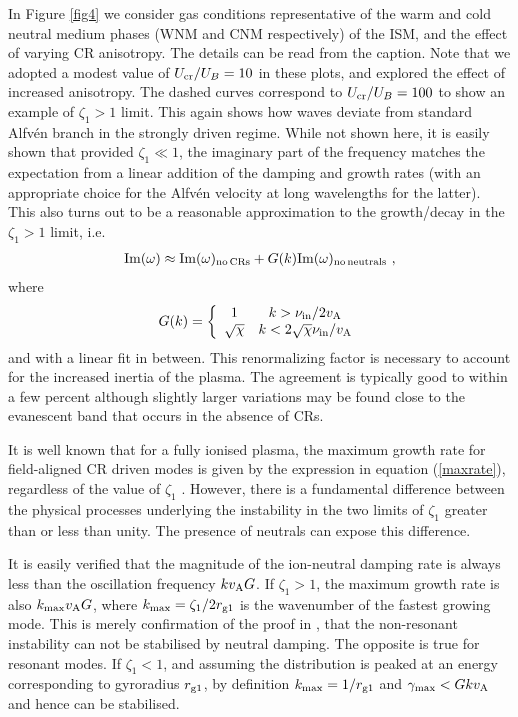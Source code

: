\documentclass[a4paper,fleqn,usenatbib]{mnras}
\newcommand{\eqb}{\begin{eqnarray}}
\newcommand{\eqe}{\end{eqnarray}}
\begin{document}
In Figure \ref{fig4} we consider gas conditions representative of the warm and cold neutral medium phases (WNM and CNM respectively) of the ISM, and the effect of varying CR anisotropy. The details can be read from the caption. Note that we adopted a modest value of $U_{\rm cr}/U_{B} = 10$ in these plots, and explored the effect of increased anisotropy. The dashed curves correspond to $U_{\rm cr}/U_{B} = 100$ to show an example of $\zeta_1>1$ limit. This again shows how waves deviate from standard Alfv\'en branch in the strongly driven regime. While not shown here, it is easily shown that provided $\zeta_1\ll1$, the imaginary part of the frequency matches the expectation from a linear addition of the damping and growth rates (with an appropriate choice for the Alfv\'en velocity at long wavelengths for the latter). This also turns out to be a reasonable approximation to the growth/decay in the  $\zeta_1>1$ limit, i.e. 
\eqb
{\rm Im}(\omega) \approx {\rm Im}(\omega)_{\rm no\, CRs} + G(k) {\rm Im}(\omega)_{\rm no\,neutrals}~,
\eqe
where 
\eqb
G(k)=\left\lbrace\begin{array}{cc}
1 & k> \nu_{\rm in}/2 v_{\rm A} \\ \sqrt{\chi} & k< 2 \sqrt{\chi} \nu_{\rm in}/ v_{\rm A}
\end{array}\right.
\eqe
and with a linear fit in between. This renormalizing factor is necessary to account for the increased inertia of the plasma. The agreement is typically good to within a few percent although slightly larger variations may be found close to the evanescent band that occurs in the absence of CRs.

It is well known that for a fully ionised plasma, the maximum growth rate for field-aligned CR driven modes is
given by the expression in equation (\ref{maxrate}), regardless of the value of $\zeta_1$ \cite[e.g.][]{BellBrazil}. However, there is a fundamental difference between the physical processes underlying the instability in the two limits of $\zeta_1$ greater than or less than unity. The presence of neutrals can expose this difference.   

It is easily verified that the magnitude of the ion-neutral damping rate is always less than the oscillation frequency $ k v_{\rm A}G$. If $\zeta_1>1$, the maximum growth rate is also $ k_{\rm max} v_{\rm A} G$, where $k_{\rm max}=\zeta_1/2r_{\rm g1}$ is the wavenumber of the fastest growing mode. This is merely confirmation of the proof in \cite{Reville07}, that the non-resonant instability can not be stabilised by neutral damping. The opposite is true for resonant modes. If $\zeta_1<1$, and assuming the distribution is peaked at an energy corresponding to gyroradius $r_{\rm g1}$, by definition $k_{\rm max}=1/r_{\rm g1}$ and $\gamma_{\rm max} <  G k v_{\rm A}$ and hence can be stabilised. 
\end{document}

